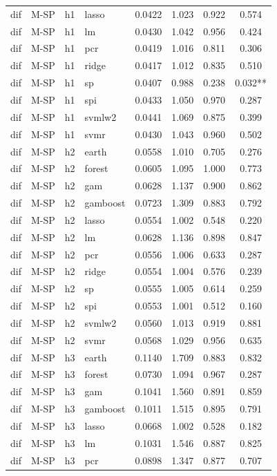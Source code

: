 \begin{ThreePartTable}
\begin{longtable}[t]{llclcccc}
dif & M-SP & h1 & lasso & 0.0422 & 1.023 & 0.922 & 0.574\\
dif & M-SP & h1 & lm & 0.0430 & 1.042 & 0.956 & 0.424\\
dif & M-SP & h1 & pcr & 0.0419 & 1.016 & 0.811 & 0.306\\
dif & M-SP & h1 & ridge & 0.0417 & 1.012 & 0.835 & 0.510\\
dif & M-SP & h1 & sp & 0.0407 & 0.988 & 0.238 & 0.032**\\
dif & M-SP & h1 & spi & 0.0433 & 1.050 & 0.970 & 0.287\\
dif & M-SP & h1 & svmlw2 & 0.0441 & 1.069 & 0.875 & 0.399\\
dif & M-SP & h1 & svmr & 0.0430 & 1.043 & 0.960 & 0.502\\
\addlinespace
dif & M-SP & h2 & earth & 0.0558 & 1.010 & 0.705 & 0.276\\
dif & M-SP & h2 & forest & 0.0605 & 1.095 & 1.000 & 0.773\\
dif & M-SP & h2 & gam & 0.0628 & 1.137 & 0.900 & 0.862\\
dif & M-SP & h2 & gamboost & 0.0723 & 1.309 & 0.883 & 0.792\\
dif & M-SP & h2 & lasso & 0.0554 & 1.002 & 0.548 & 0.220\\
dif & M-SP & h2 & lm & 0.0628 & 1.136 & 0.898 & 0.847\\
dif & M-SP & h2 & pcr & 0.0556 & 1.006 & 0.633 & 0.287\\
dif & M-SP & h2 & ridge & 0.0554 & 1.004 & 0.576 & 0.239\\
dif & M-SP & h2 & sp & 0.0555 & 1.005 & 0.614 & 0.259\\
dif & M-SP & h2 & spi & 0.0553 & 1.001 & 0.512 & 0.160\\
dif & M-SP & h2 & svmlw2 & 0.0560 & 1.013 & 0.919 & 0.881\\
dif & M-SP & h2 & svmr & 0.0568 & 1.029 & 0.956 & 0.635\\
\addlinespace
dif & M-SP & h3 & earth & 0.1140 & 1.709 & 0.883 & 0.832\\
dif & M-SP & h3 & forest & 0.0730 & 1.094 & 0.967 & 0.287\\
dif & M-SP & h3 & gam & 0.1041 & 1.560 & 0.891 & 0.859\\
dif & M-SP & h3 & gamboost & 0.1011 & 1.515 & 0.895 & 0.791\\
dif & M-SP & h3 & lasso & 0.0668 & 1.002 & 0.528 & 0.182\\
dif & M-SP & h3 & lm & 0.1031 & 1.546 & 0.887 & 0.825\\
dif & M-SP & h3 & pcr & 0.0898 & 1.347 & 0.877 & 0.707\\

\end{longtable}
\end{ThreePartTable}
